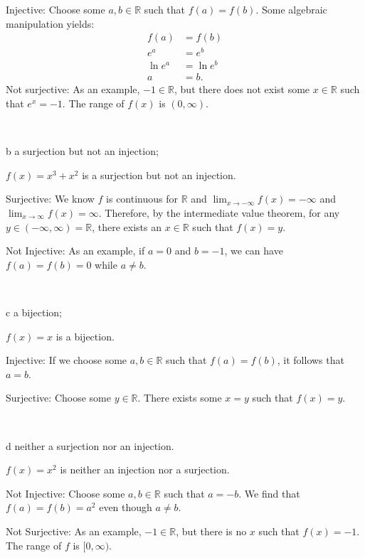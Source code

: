 \documentclass{article}
\begin{document}
Injective: Choose some $a,b\in \mathbb{R}$ such that $f( a) =f( b)$. Some algebraic manipulation yields:
\begin{align*}
f( a) & =f( b)\\
e^{a} & =e^{b}\\
\ln e^{a} & =\ln e^{b}\\
a & =b.
\end{align*}
Not surjective: As an example, $-1\in \mathbb{R}$, but there does not exist some $x\in \mathbb{R}$ such that $e^{x} =-1$. The range of $f( x)$ is $( 0,\infty )$.



\

\begin{problem} b
a surjection but not an injection;
\end{problem}

$f( x) =x^{3} +x^{2}$ is a surjection but not an injection.

Surjective: We know $f$ is continuous for $\mathbb{R}$ and $\lim _{x\rightarrow -\infty } f( x) =-\infty $ and $\lim _{x\rightarrow \infty } f( x) =\infty $. Therefore, by the intermediate value theorem, for any $y\in ( -\infty ,\infty ) =\mathbb{R}$, there exists an $x\in \mathbb{R}$ such that $f( x) =y$.

Not Injective: As an example, if $a=0$ and $b=-1$, we can have $f( a) =f( b) =0$ while $a\neq b$.

\

\begin{problem} c
a bijection; 
\end{problem}

$f( x) =x$ is a bijection.

Injective: If we choose some $a,b\in \mathbb{R}$ such that $f( a) =f( b)$, it follows that $a=b$.

Surjective: Choose some $y\in \mathbb{R}$. There exists some $x=y$ such that $f( x) =y$.

\

\begin{problem} d
neither a surjection nor an injection.
\end{problem}

$f( x) =x^{2}$ is neither an injection nor a surjection.

Not Injective: Choose some $a,b\in \mathbb{R}$ such that $a=-b$. We find that $f( a) =f( b) =a^{2}$ even though $a\neq b$.

Not Surjective: As an example, $-1\in \mathbb{R}$, but there is no $x$ such that $f( x) =-1$. The range of $f$ is $[ 0,\infty )$.
\end{document}
